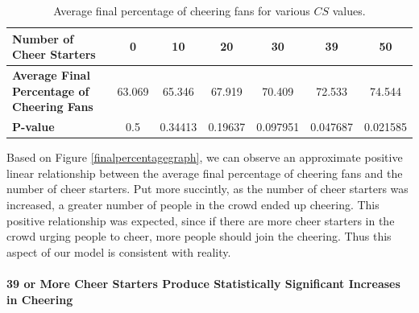 \documentclass[oneside,12pt]{report}
\begin{document}
\begin{table}[h!]
\begin{center}
\begin{footnotesize}\begin{tabular}{|p{5cm}|c|c|c|c|c|c|}
\hline
\textbf{Number of Cheer Starters}&0&10&20&30&39&50\\\hline
\textbf{Average Final Percentage of Cheering Fans}&63.069&65.346&67.919&70.409&72.533&74.544\\\hline
\textbf{P-value}&0.5&0.34413&0.19637&0.097951&0.047687&0.021585\\\hline
\end{tabular}
\end{footnotesize}
\caption{Average final percentage of cheering fans for various $CS$ values.}
\label{finalpercenttable}
\end{center}
\end{table}

Based on Figure \ref{finalpercentagegraph}, we can observe an approximate positive linear relationship between the average final percentage of cheering fans and the number of cheer starters. Put more succintly, as the number of cheer starters was increased, a greater number of people in the crowd ended up cheering. This positive relationship was expected, since if there are more cheer starters in the crowd urging people to cheer, more people should join the cheering. Thus this aspect of our model is consistent with reality. 
\paragraph{39 or More Cheer Starters Produce Statistically Significant Increases in Cheering }
\end{document}
